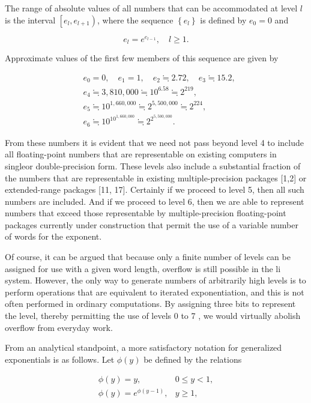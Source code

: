 \documentclass[10pt]{article}
\begin{document}
The range of absolute values of all numbers that can be accommodated at level $l$ is the interval $\left[e_{l}, e_{l+1}\right)$, where the sequence $\left\{e_{l}\right\}$ is defined by $e_{0}=0$ and

$$
e_{l}=e^{e_{l-1}}, \quad l \geq 1 .
$$

Approximate values of the first few members of this sequence are given by

$$
\begin{aligned}
& e_{0}=0, \quad e_{1}=1, \quad e_{2} \fallingdotseq 2.72, \quad e_{3} \fallingdotseq 15.2, \\
& e_{4} \fallingdotseq 3,810,000 \fallingdotseq 10^{6.58} \fallingdotseq 2^{219}, \\
& e_{5} \fallingdotseq 10^{1,660,000} \fallingdotseq 2^{5,500,000} \fallingdotseq 2^{224}, \\
& e_{6} \fallingdotseq 10^{10^{1,660,000}} \fallingdotseq 2^{2^{5,500,000}} .
\end{aligned}
$$

From these numbers it is evident that we need not pass beyond level 4 to include all floating-point numbers that are representable on existing computers in singleor double-precision form. These levels also include a substantial fraction of the numbers that are representable in existing multiple-precision packages [1,2] or extended-range packages [11, 17]. Certainly if we proceed to level 5, then all such numbers are included. And if we proceed to level 6, then we are able to represent numbers that exceed those representable by multiple-precision floating-point packages currently under construction that permit the use of a variable number of words for the exponent.

Of course, it can be argued that because only a finite number of levels can be assigned for use with a given word length, overflow is still possible in the li system. However, the only way to generate numbers of arbitrarily high levels is to perform operations that are equivalent to iterated exponentiation, and this is not often performed in ordinary computations. By assigning three bits to represent the level, thereby permitting the use of levels 0 to 7 , we would virtually abolish overflow from everyday work.

From an analytical standpoint, a more satisfactory notation for generalized exponentials is as follows. Let $\phi(y)$ be defined by the relations

\[
\begin{array}{ll}
\phi(y)=y, & 0 \leq y<1, \\
\phi(y)=e^{\phi(y-1)}, & y \geq 1, \tag{5}
\end{array}
\]
\end{document}
